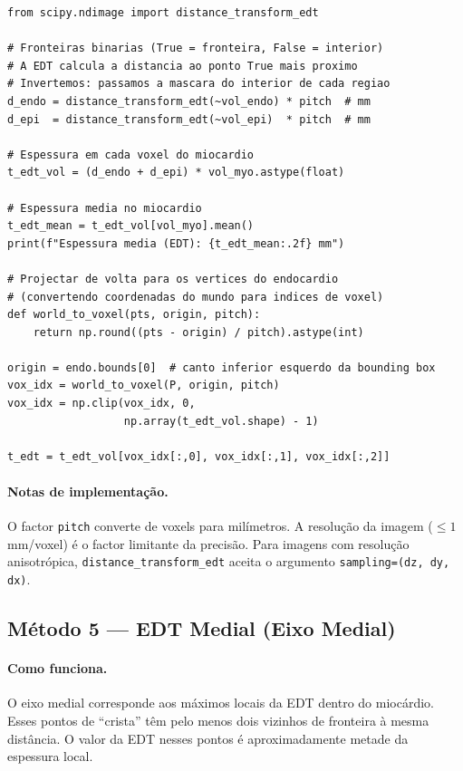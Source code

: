 \begin{lstlisting}
from scipy.ndimage import distance_transform_edt

# Fronteiras binarias (True = fronteira, False = interior)
# A EDT calcula a distancia ao ponto True mais proximo
# Invertemos: passamos a mascara do interior de cada regiao
d_endo = distance_transform_edt(~vol_endo) * pitch  # mm
d_epi  = distance_transform_edt(~vol_epi)  * pitch  # mm

# Espessura em cada voxel do miocardio
t_edt_vol = (d_endo + d_epi) * vol_myo.astype(float)

# Espessura media no miocardio
t_edt_mean = t_edt_vol[vol_myo].mean()
print(f"Espessura media (EDT): {t_edt_mean:.2f} mm")

# Projectar de volta para os vertices do endocardio
# (convertendo coordenadas do mundo para indices de voxel)
def world_to_voxel(pts, origin, pitch):
    return np.round((pts - origin) / pitch).astype(int)

origin = endo.bounds[0]  # canto inferior esquerdo da bounding box
vox_idx = world_to_voxel(P, origin, pitch)
vox_idx = np.clip(vox_idx, 0,
                  np.array(t_edt_vol.shape) - 1)

t_edt = t_edt_vol[vox_idx[:,0], vox_idx[:,1], vox_idx[:,2]]
\end{lstlisting}

\paragraph{Notas de implementação.}
O factor \texttt{pitch} converte de voxels para milímetros.
A resolução da imagem ($\leq 1$\,mm/voxel) é o factor limitante
da precisão. Para imagens com resolução anisotrópica,
\texttt{distance\_transform\_edt} aceita o argumento
\texttt{sampling=(dz, dy, dx)}.

\subsection{Método 5 --- EDT Medial (Eixo Medial)}
\label{impl:medial}

\paragraph{Como funciona.}
O eixo medial corresponde aos máximos locais da EDT dentro do
miocárdio. Esses pontos de ``crista'' têm pelo menos dois vizinhos
de fronteira à mesma distância. O valor da EDT nesses pontos é
aproximadamente metade da espessura local.

